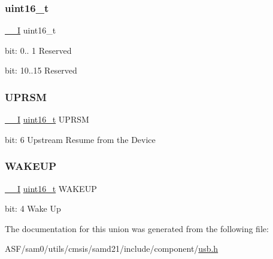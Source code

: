 \subsubsection{\texorpdfstring{uint16\_t}{uint16\_t}}
{\footnotesize\ttfamily \mbox{\hyperlink{core__cm0plus_8h_af63697ed9952cc71e1225efe205f6cd3}{\+\_\+\+\_\+I}} uint16\+\_\+t}

bit\+: 0.. 1 Reserved

bit\+: 10..15 Reserved \mbox{\label{union_u_s_b___h_o_s_t___i_n_t_f_l_a_g___type_a967d41d70af5b8569d8b5ab91c56369e}} 
\subsubsection{\texorpdfstring{UPRSM}{UPRSM}}
{\footnotesize\ttfamily \mbox{\hyperlink{core__cm0plus_8h_af63697ed9952cc71e1225efe205f6cd3}{\+\_\+\+\_\+I}} \mbox{\hyperlink{union_u_s_b___h_o_s_t___i_n_t_f_l_a_g___type_a25e8fd3335b0c4872c6e2910bd01f0f6}{uint16\+\_\+t}} U\+P\+R\+SM}

bit\+: 6 Upstream Resume from the Device \mbox{\label{union_u_s_b___h_o_s_t___i_n_t_f_l_a_g___type_a84bb3fe0a50a407a76cf6111eee40622}} 
\subsubsection{\texorpdfstring{WAKEUP}{WAKEUP}}
{\footnotesize\ttfamily \mbox{\hyperlink{core__cm0plus_8h_af63697ed9952cc71e1225efe205f6cd3}{\+\_\+\+\_\+I}} \mbox{\hyperlink{union_u_s_b___h_o_s_t___i_n_t_f_l_a_g___type_a25e8fd3335b0c4872c6e2910bd01f0f6}{uint16\+\_\+t}} W\+A\+K\+E\+UP}

bit\+: 4 Wake Up 

The documentation for this union was generated from the following file\+:\begin{DoxyCompactItemize}
\item 
A\+S\+F/sam0/utils/cmsis/samd21/include/component/\mbox{\hyperlink{component_2usb_8h}{usb.\+h}}\end{DoxyCompactItemize}
